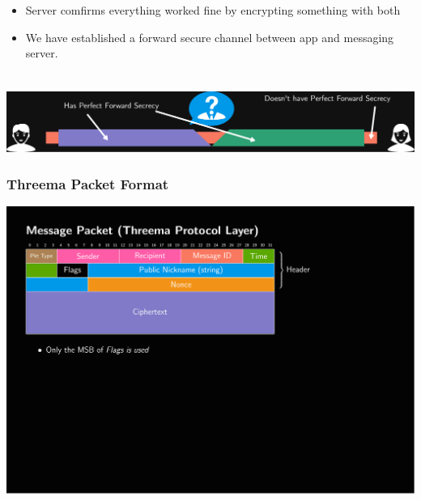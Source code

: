 \documentclass[
	aspectratio=169,
	xetex,
]{beamer}
\begin{document}
\begin{frame}[t]
\begin{overlayarea}{\textwidth}{\textheight}
\begin{columns}
\begin{column}[t]{.69\textwidth}
\begin{overlayarea}{\textwidth}{\textheight}
{						\begin{itemize}
							\item Server comfirms everything worked fine by encrypting something with both 
							\item We have established a forward secure channel between app and messaging server.
						\end{itemize}
					}	
				\end{overlayarea} \end{column}
		\end{columns}
	\end{overlayarea}
\end{frame}

\begin{frame}
	\frametitle{}
		\begin{center}\includegraphics[width=\textwidth]{img/2-layer-tunnel2.pdf}\end{center}
\end{frame}

\begin{frame}
	\frametitle{Threema Packet Format}

	\includegraphics[page=1,clip,trim={.99cm 8cm 3.2cm 1.8cm},width=\textwidth]{out/messages.pdf}

\end{frame}
\end{document}
